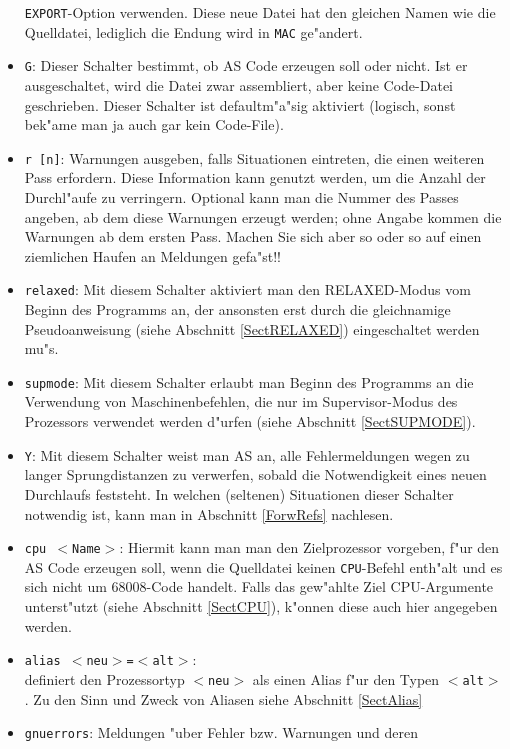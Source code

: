 \documentclass[12pt,a4paper,twoside]{report}
\newcommand{\tty}[1]{{\tt #1}}
\begin{document}
\begin{itemize}
{      \tty{EXPORT}-Option verwenden.  Diese neue Datei hat den gleichen
      Namen wie die Quelldatei, lediglich die Endung wird in \tty{MAC} ge"andert.}
\item{\tty{G}: Dieser Schalter bestimmt, ob AS Code erzeugen soll oder nicht.
      Ist er ausgeschaltet, wird die Datei zwar assembliert,
      aber keine Code-Datei geschrieben. Dieser Schalter ist defaultm"a"sig aktiviert
      (logisch, sonst bek"ame man ja auch gar kein Code-File).}
\item{\tty{r [n]}: Warnungen ausgeben, falls Situationen eintreten, die
      einen weiteren Pass erfordern.  Diese Information kann genutzt
      werden, um die Anzahl der Durchl"aufe zu verringern.  Optional kann
      man die Nummer des Passes angeben, ab dem diese Warnungen erzeugt
      werden; ohne Angabe kommen die Warnungen ab dem ersten Pass.  Machen
      Sie sich aber so oder so auf einen ziemlichen Haufen an Meldungen
      gefa"st!!}
\item{\tty{relaxed}: Mit diesem Schalter aktiviert man den RELAXED-Modus
      vom Beginn des Programms an, der ansonsten erst durch die gleichnamige
      Pseudoanweisung (siehe Abschnitt \ref{SectRELAXED}) eingeschaltet
      werden mu"s.}
\item{\tty{supmode}: Mit diesem Schalter erlaubt man Beginn des Programms
      an die Verwendung von Maschinenbefehlen, die nur im Supervisor-Modus
      des Prozessors verwendet werden d"urfen (siehe Abschnitt \ref{SectSUPMODE}).}
\item{\tty{Y}: Mit diesem Schalter weist man AS an, alle Fehlermeldungen
      wegen zu langer Sprungdistanzen zu verwerfen, sobald die Notwendigkeit
      eines neuen Durchlaufs feststeht.  In welchen (seltenen) Situationen
      dieser Schalter notwendig ist, kann man in Abschnitt \ref{ForwRefs}
      nachlesen.}
\item{\tty{cpu $<$Name$>$}: Hiermit kann man man den Zielprozessor
      vorgeben, f"ur den AS Code erzeugen soll, wenn die Quelldatei keinen
      {\tt CPU}-Befehl enth"alt und es sich nicht um 68008-Code handelt.
      Falls das gew"ahlte Ziel CPU-Argumente unterst"utzt (siehe Abschnitt
      \ref{SectCPU}), k"onnen diese auch hier angegeben werden.}
\item{\tty{alias $<$neu$>$=$<$alt$>$}:\\
      definiert den Prozessortyp \tty{$<$neu$>$} als einen Alias f"ur den
      Typen \tty{$<$alt$>$}.  Zu den Sinn und Zweck von Aliasen siehe
      Abschnitt \ref{SectAlias}}
\item{{\tt gnuerrors}: Meldungen "uber Fehler bzw. Warnungen und deren
}
\end{itemize}
\end{document}

